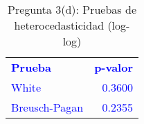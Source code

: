 \begin{table}[H]
\centering
\caption{Pregunta 3(d): Pruebas de heterocedasticidad (log-log)}
\label{tab:q3d_loglog_hetero}
\begin{tabular}{lr}
\rowcolor{blue!10}
\toprule
\rowcolor{blue!20}
\textcolor{blue}{\textbf{Prueba}} & \textcolor{blue}{\textbf{p-valor}} \\
\addlinespace
\rowcolor{blue!10}
\textcolor{blue}{White} & \textcolor{blue}{0.3600} \\
\rowcolor{blue!10}
\textcolor{blue}{Breusch-Pagan} & \textcolor{blue}{0.2355} \\
\bottomrule
\end{tabular}
\end{table}
